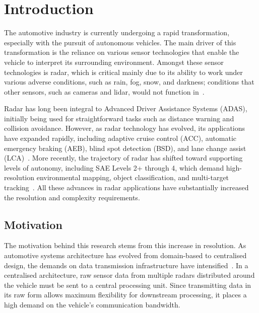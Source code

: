 \chapter{Introduction}
\label{ch:intro}

The automotive industry is currently undergoing a rapid transformation, especially with the pursuit of autonomous vehicles. The main driver of this transformation is the reliance on various sensor technologies that enable the vehicle to interpret its surrounding environment. Amongst these sensor technologies is radar, which is critical mainly due to its ability to work under various adverse conditions, such as rain, fog, snow, and darkness; conditions that other sensors, such as cameras and lidar, would not function in~\cite{waldschmidt2021,yao2023}.

Radar has long been integral to Advanced Driver Assistance Systems (ADAS), initially being used for straightforward tasks such as distance warning and collision avoidance. However, as radar technology has evolved, its applications have expanded rapidly, including adaptive cruise control (ACC), automatic emergency braking (AEB), blind spot detection (BSD), and lane change assist (LCA)~\cite{skolnik2008}. More recently, the trajectory of radar has shifted toward supporting levels of autonomy, including SAE Levels 2+ through 4, which demand high-resolution environmental mapping, object classification, and multi-target tracking~\cite{infineon2024}. All these advances in radar applications have substantially increased the resolution and complexity requirements.

\section{Motivation}
\label{sec:motivation}
\label{sec:problem}

The motivation behind this research stems from this increase in resolution. As automotive systems architecture has evolved from domain-based to centralised design, the demands on data transmission infrastructure have intensified~\cite{bandur2021,liu2022}. In a centralised architecture, raw sensor data from multiple radars distributed around the vehicle must be sent to a central processing unit. Since transmitting data in its raw form allows maximum flexibility for downstream processing, it places a high demand on the vehicle's communication bandwidth.

